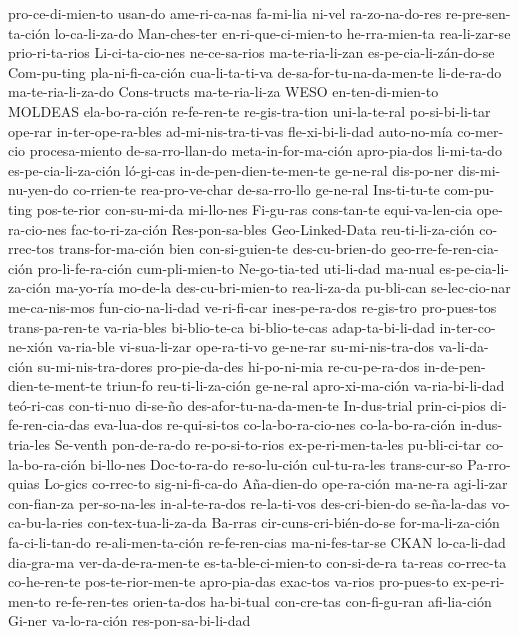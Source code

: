 {pro-ce-di-mien-to usan-do ame-ri-ca-nas fa-mi-lia ni-vel ra-zo-na-do-res re-pre-sen-ta-ción lo-ca-li-za-do Man-ches-ter 
en-ri-que-ci-mien-to he-rra-mien-ta rea-li-zar-se prio-ri-ta-rios Li-ci-ta-cio-nes ne-ce-sa-rios ma-te-ria-li-zan es-pe-cia-li-zán-do-se 
Com-pu-ting pla-ni-fi-ca-ción cua-li-ta-ti-va de-sa-for-tu-na-da-men-te li-de-ra-do ma-te-ria-li-za-do Cons-tructs 
ma-te-ria-li-za WESO en-ten-di-mien-to MOLDEAS ela-bo-ra-ción re-fe-ren-te re-gis-tra-tion uni-la-te-ral po-si-bi-li-tar ope-rar 
in-ter-ope-ra-bles ad-mi-nis-tra-ti-vas fle-xi-bi-li-dad auto-no-mía co-mer-cio procesa-miento de-sa-rro-llan-do meta-in-for-ma-ción 
apro-pia-dos li-mi-ta-do es-pe-cia-li-za-ción ló-gi-cas in-de-pen-dien-te-men-te ge-ne-ral dis-po-ner dis-mi-nu-yen-do co-rrien-te 
rea-pro-ve-char de-sa-rro-llo ge-ne-ral Ins-ti-tu-te com-pu-ting pos-te-rior con-su-mi-da mi-llo-nes Fi-gu-ras cons-tan-te equi-va-len-cia ope-ra-cio-nes 
fac-to-ri-za-ción Res-pon-sa-bles Geo-Linked-Data reu-ti-li-za-ción co-rrec-tos trans-for-ma-ción bien con-si-guien-te des-cu-brien-do 
geo-rre-fe-ren-cia-ción pro-li-fe-ra-ción cum-pli-mien-to Ne-go-tia-ted uti-li-dad ma-nual es-pe-cia-li-za-ción ma-yo-ría mo-de-la 
des-cu-bri-mien-to rea-li-za-da pu-bli-can se-lec-cio-nar me-ca-nis-mos fun-cio-na-li-dad ve-ri-fi-car ines-pe-ra-dos re-gis-tro 
pro-pues-tos trans-pa-ren-te va-ria-bles bi-blio-te-ca bi-blio-te-cas adap-ta-bi-li-dad in-ter-co-ne-xión va-ria-ble vi-sua-li-zar 
ope-ra-ti-vo ge-ne-rar su-mi-nis-tra-dos va-li-da-ción su-mi-nis-tra-dores pro-pie-da-des hi-po-ni-mia re-cu-pe-ra-dos in-de-pen-dien-te-ment-te 
triun-fo reu-ti-li-za-ción ge-ne-ral apro-xi-ma-ción va-ria-bi-li-dad teó-ri-cas con-ti-nuo di-se-ño des-afor-tu-na-da-men-te In-dus-trial prin-ci-pios 
di-fe-ren-cia-das eva-lua-dos re-qui-si-tos co-la-bo-ra-cio-nes co-la-bo-ra-ción in-dus-tria-les Se-venth pon-de-ra-do re-po-si-to-rios 
ex-pe-ri-men-ta-les pu-bli-ci-tar co-la-bo-ra-ción bi-llo-nes Doc-to-ra-do re-so-lu-ción cul-tu-ra-les trans-cur-so Pa-rro-quias Lo-gics co-rrec-to 
sig-ni-fi-ca-do Aña-dien-do ope-ra-ción ma-ne-ra agi-li-zar con-fian-za per-so-na-les in-al-te-ra-dos re-la-ti-vos des-cri-bien-do 
se-ña-la-das vo-ca-bu-la-ries con-tex-tua-li-za-da Ba-rras cir-cuns-cri-bién-do-se for-ma-li-za-ción fa-ci-li-tan-do re-ali-men-ta-ción 
re-fe-ren-cias ma-ni-fes-tar-se CKAN lo-ca-li-dad dia-gra-ma ver-da-de-ra-men-te es-ta-ble-ci-mien-to con-si-de-ra ta-reas co-rrec-ta 
co-he-ren-te pos-te-rior-men-te apro-pia-das exac-tos va-rios pro-pues-to ex-pe-ri-men-to re-fe-ren-tes orien-ta-dos ha-bi-tual con-cre-tas 
con-fi-gu-ran afi-lia-ción Gi-ner va-lo-ra-ción res-pon-sa-bi-li-dad}   

